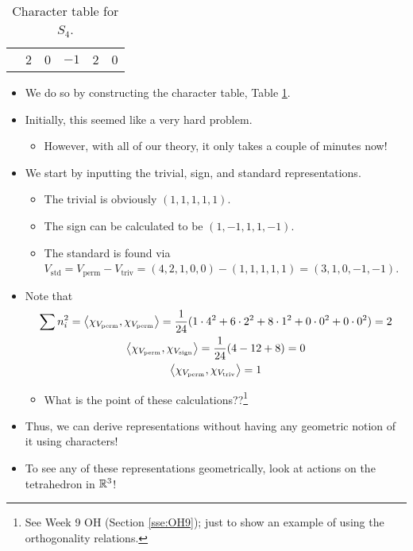 \documentclass[../notes.tex]{subfiles}
\begin{document}
\begin{itemize}
\begin{table}[h!]
\begin{tabular}{c|c|c|c|c|c|}
             & 2 & 0 & $-1$ & 2 & 0\\
        \end{tabular}
        \caption{Character table for $S_4$.}
        \label{tab:charTableS4}
    \end{table}
    \begin{itemize}
        \item We do so by constructing the character table, Table \ref{tab:charTableS4}.
        \item Initially, this seemed like a very hard problem.
        \begin{itemize}
            \item However, with all of our theory, it only takes a couple of minutes now!
        \end{itemize}
        \item We start by inputting the trivial, sign, and standard representations.
        \begin{itemize}
            \item The trivial is obviously $(1,1,1,1,1)$.
            \item The sign can be calculated to be $(1,-1,1,1,-1)$.
            \item The standard is found via $V_\text{std}=V_\text{perm}-V_\text{triv}=(4,2,1,0,0)-(1,1,1,1,1)=(3,1,0,-1,-1)$.
        \end{itemize}
        \item Note that
        \begin{gather*}
            \sum n_i^2 = \left\langle{\chi_{V_\text{perm}},\chi_{V_\text{perm}}}\right\rangle
                = \frac{1}{24}(1\cdot 4^2+6\cdot 2^2+8\cdot 1^2+0\cdot 0^2+0\cdot 0^2)
                = 2\\
            \left\langle{\chi_{V_\text{perm}},\chi_{V_\text{sign}}}\right\rangle = \frac{1}{24}(4-12+8)
                = 0\\
            \left\langle{\chi_{V_\text{perm}},\chi_{V_\text{triv}}}\right\rangle = 1
        \end{gather*}
        \begin{itemize}
            \item What is the point of these calculations??\footnote{See Week 9 OH (Section \ref{sse:OH9}); just to show an example of using the orthogonality relations.}
        \end{itemize}
        \item Thus, we can derive representations without having any geometric notion of it using characters!
        \item To see any of these representations geometrically, look at actions on the tetrahedron in $\mathbb{R}^3$!

\end{itemize}
\end{itemize}
\end{document}
